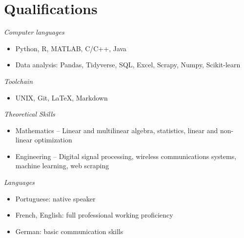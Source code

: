 \section{Qualifications} 

{\sl Computer languages} 
\begin{itemize}
	\item[] Python, R, MATLAB, C/C++, Java
	\item[] Data analysis: Pandas, Tidyverse, SQL, Excel, Scrapy, Numpy, Scikit-learn
\end{itemize}

{\sl Toolchain}
\begin{itemize}
	\item[] UNIX, Git, \LaTeX, Markdown
\end{itemize}

{\sl Theoretical Skills}
\begin{itemize}
	\item[] Mathematics --  Linear and multilinear algebra, statistics, linear and non-linear optimization
	\item[] Engineering -- Digital signal processing, wireless communications systems, machine learning, web scraping
\end{itemize}

{\sl Languages}
\begin{itemize}
	\item[] Portuguese: native speaker
	\item[] French, English: full professional working proficiency
	\item[] German: basic communication skills
\end{itemize}